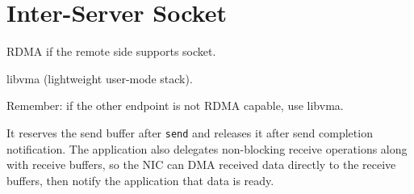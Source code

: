 \section{Inter-Server Socket}
\label{sec:rdma}

RDMA if the remote side supports socket.

 libvma (lightweight user-mode stack).

Remember: if the other endpoint is not RDMA capable, use libvma.

 It reserves the send buffer after \texttt{send} and releases it after send completion notification.
The application also delegates non-blocking receive operations along with receive buffers, so the NIC can DMA received data directly to the receive buffers, then notify the application that data is ready.